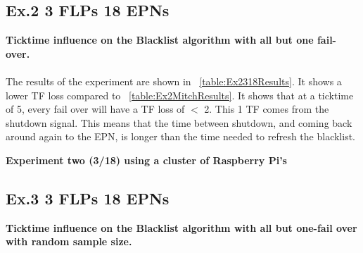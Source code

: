 \newpage

\subsection*{Ex.2 3 FLPs 18 EPNs}
\textbf{Ticktime influence on the Blacklist algorithm with all but one fail-over.}
\\~\\
The results of the experiment are shown in ~\ref{table:Ex2318Results}. It shows a lower TF loss compared to ~\ref{table:Ex2MitchResults}. It shows that at a ticktime of 5, every fail over will have a TF loss of $<$ 2. This 1 TF comes from the shutdown signal. This means that the time between shutdown, and coming back around again to the EPN, is longer than the time needed to refresh the blacklist. 

\begin{table}[h!]
\caption*{\textbf{Experiment two (3/18) using a cluster of Raspberry Pi's}}
\caption{Cumulative lost TFs by ticktime/EPN ratio with a flat sample size for the Blacklist algorithm}
\label{table:Ex2318Results}
\end{table}

\subsection*{Ex.3 3 FLPs 18 EPNs}
\textbf{Ticktime influence on the Blacklist algorithm with all but one-fail over with random sample size.}
\\~\\

